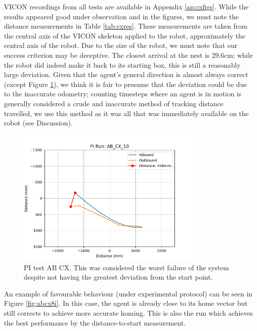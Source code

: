 \documentclass[a4paper,11pt,twoside,openright]{article}
\begin{document}
VICON recordings from all tests are available in Appendix
\ref{ap:cxfigs}. While the results appeared good under observation and
in the figures, we must note the distance measurements in Table
\ref{tab:cxres}. These measurements are taken from the central axis of
the VICON skeleton applied to the robot, approximately the central axis
of the robot. Due to the size of the robot, we must note that our
success criterion may be deceptive. The closest arrival at the nest is
29.6cm; while the robot did indeed make it back to its starting box,
this is still a reasonably large deviation. Given that the agent's
general direction is almost always correct (except Figure
\ref{fig:abcx10i}), we think it is fair to presume that the deviation
could be due to the inaccurate odometry; counting timesteps where an
agent is in motion is generally considered a crude and inaccurate
method of tracking distance travelled, we use this method as it was
all that was immediately available on the robot (see Discussion).
\newline\par

\begin{figure}[h!]
  \centering
  \includegraphics[width=0.8\textwidth]{AB_CX_10}
  \caption{\label{fig:abcx10i} PI test AB\textunderscore
    CX. This was considered the worst failure of the
  system despite not having the greatest deviation from the start point.}
\end{figure}

An example of favourable behaviour (under experimental protocol) can
be seen in Figure \ref{fig:abcx8i}. In this case, the agent is already
close to its home vector but still corrects to achieve more accurate
homing. This is also the run which achieves the best performance by
the distance-to-start measurement.
\newline\par
\end{document}
